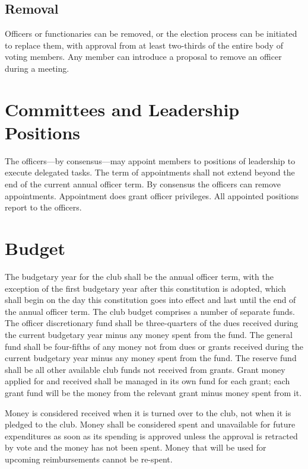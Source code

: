 \documentclass{article}
\begin{document}
\subsection{Removal}

Officers or functionaries can be removed, or the election process can be
initiated to replace them, with approval from at least two-thirds of the entire
body of voting members. Any member can introduce a proposal to remove an officer
during a meeting.

\section{Committees and Leadership Positions}

The officers---by consensus---may appoint members to positions of leadership to
execute delegated tasks. The term of appointments shall not extend beyond the
end of the current annual officer term. By consensus the officers can remove
appointments. Appointment does grant officer privileges. All appointed positions
report to the officers.

\section{Budget}

The budgetary year for the club shall be the annual officer term, with the
exception of the first budgetary year after this constitution is adopted, which
shall begin on the day this constitution goes into effect and last until the end
of the annual officer term. The club budget comprises a number of separate
funds. The officer discretionary fund shall be three-quarters of the dues
received during the current budgetary year minus any money spent from the fund.
The general fund shall be four-fifths of any money not from dues or grants
received during the current budgetary year minus any money spent from the fund.
The reserve fund shall be all other available club funds not received from
grants. Grant money applied for and received shall be managed in its own fund
for each grant; each grant fund will be the money from the relevant grant minus
money spent from it.

Money is considered received when it is turned over to the club, not when it is
pledged to the club. Money shall be considered spent and unavailable for future
expenditures as soon as its spending is approved unless the approval is
retracted by vote and the money has not been spent. Money that will be used for
upcoming reimbursements cannot be re-spent.
\end{document}
